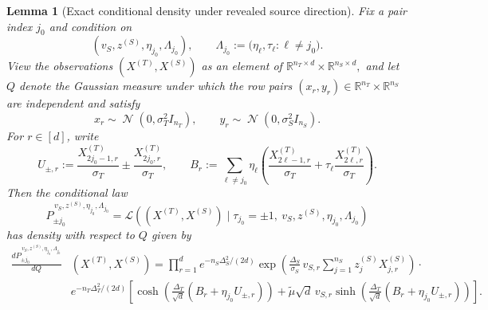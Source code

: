 \documentclass[10pt]{article}
\newtheorem{lemma}{Lemma}
\newcommand{\R}{\mathbb R}
\DeclareMathOperator{\dnorm}{\mathcal N}
\newcommand{\trg}{T}
\newcommand{\nT}{n_{\trg}}
\newcommand{\sigmaT}{\sigma_{\trg}}
\newcommand{\Xtar}{X^{(\trg)}}
\newcommand{\DeltaT}{\Delta_{\trg}}
\newcommand{\src}{S}
\newcommand{\nS}{n_{\src}}
\newcommand{\sigmaS}{\sigma_{\src}}
\newcommand{\Xsrc}{X^{(\src)}}
\newcommand{\zsrc}{z^{(\src)}}
\newcommand{\DeltaS}{\Delta_{\src}}
\begin{document}
\begin{lemma}[Exact conditional density under revealed source direction]
\label{lem:sec3_oracle2_row_density}
Fix a pair index $j_0$ and condition on
\[
    (v_{\src},\zsrc,\eta_{j_0},\Lambda_{j_0}),
    \qquad
    \Lambda_{j_0}:=\bigl(\eta_\ell,\tau_\ell:\ell\neq j_0\bigr).
\]
View the observations $(\Xtar,\Xsrc)$ as an element of
$ \R^{\nT\times d}\times \R^{\nS\times d},$
and let $Q$ denote the Gaussian measure under which the row pairs
$(x_r,y_r)\in\R^{\nT}\times\R^{\nS}$ are independent and satisfy
\[
    x_r\sim\dnorm(0,\sigmaT^2 I_{\nT}),
    \qquad
    y_r\sim\dnorm(0,\sigmaS^2 I_{\nS}).
\]
For $r\in[d]$, write
\begin{equation}\label{eq:def-Br}
    U_{\pm,r}:=\frac{X^{(T)}_{2j_0-1,r}}{\sigmaT}
    \pm
    \frac{X^{(T)}_{2j_0,r}}{\sigmaT},
    \qquad
    B_r:=\sum_{\ell\neq j_0}\eta_\ell\left(
        \frac{X^{(T)}_{2\ell-1,r}}{\sigmaT}
        +
        \tau_\ell\frac{X^{(T)}_{2\ell,r}}{\sigmaT}
    \right).
\end{equation}
Then the conditional law
\[
    P_{\pm j_0}^{\,v_{\src},\zsrc,\eta_{j_0},\Lambda_{j_0}}
    =
    \mathcal L\!\left(
        (\Xtar,\Xsrc)\mid
        \tau_{j_0}=\pm1,\ v_{\src},\zsrc,\eta_{j_0},\Lambda_{j_0}
    \right)
\]
has density with respect to $Q$ given by
\begin{align}
\label{eq:sec3_oracle2_row_density}
    \frac{dP_{\pm j_0}^{\,v_{\src},\zsrc,\eta_{j_0},\Lambda_{j_0}}}{dQ}
    &(\Xtar,\Xsrc)
    =
    \prod_{r=1}^d
    e^{-\nS\DeltaS^2/(2d)}
    \exp\!\left(
        \frac{\DeltaS}{\sigmaS}\,v_{\src,r}
        \sum_{j=1}^{\nS}\zsrc_j X^{(S)}_{j,r}
    \right)
    \cdot\\
    &e^{-\nT\DeltaT^2/(2d)}
    \left[
        \cosh\!\left(
            \frac{\DeltaT}{\sqrt d}(B_r+\eta_{j_0} U_{\pm,r})
        \right)
        +
        \tilde\mu \sqrt d\, v_{\src,r} \sinh\!\left(
            \frac{\DeltaT}{\sqrt d}(B_r+\eta_{j_0} U_{\pm,r})
        \right)
    \right].
\end{align}
\end{lemma}
\end{document}

